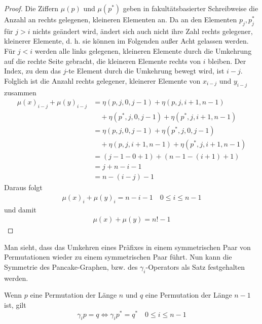 \documentclass[a4paper, 10pt, ngerman]{article}
\begin{document}
\begin{proof}
    Die Ziffern $\mu(p)$ und $\mu(p^*)$ geben in fakultätsbasierter Schreibweise die Anzahl an rechts gelegenen, kleineren Elementen an. Da an den Elementen $p_j, p^*_j$ für $j > i$ nichts geändert wird, ändert sich auch nicht ihre Zahl rechts gelegener, kleinerer Elemente, d. h. sie können im Folgenden außer Acht gelassen werden. Für $j < i$ werden alle links gelegenen, kleineren Elemente durch die Umkehrung auf die rechte Seite gebracht, die kleineren Elemente rechts von $i$ bleiben. Der Index, zu dem das $j$-te Element durch die Umkehrung bewegt wird, ist $i - j$. Folglich ist die Anzahl rechts gelegener, kleinerer Elemente von $x_{i - j}$ und $y_{i - j}$ zusammen
    \begin{align*}
        \mu(x)_{i - j} + \mu(y)_{i - j}
         & =  \eta(p, j, 0, j - 1) + \eta(p, j, i + 1, n - 1)            \\
         & \quad + \eta(p^*, j, 0, j - 1) + \eta(p^*, j, i + 1, n - 1)   \\
         & =  \eta(p, j, 0, j - 1) + \eta(p^*, j, 0, j - 1)              \\
         & \quad + \eta(p, j, i + 1, n - 1) + \eta(p^*, j, i + 1, n - 1) \\
         & =  (j - 1 - 0 + 1) + (n - 1 - (i + 1) + 1)                    \\
         & =  j + n - i - 1                                              \\
         & =  n - (i - j) - 1
    \end{align*}
    Daraus folgt
    \begin{align*}
        \mu(x)_i + \mu(y)_i = n - i - 1 \quad 0 \le i \le n - 1
    \end{align*}
    und damit
    \begin{align*}
        \mu(x) + \mu(y) = n! - 1
    \end{align*}
\end{proof}

Man sieht, dass das Umkehren eines Präfixes in einem symmetrischen Paar von Permutationen wieder zu einem symmetrischen Paar führt. Nun kann die Symmetrie des Pancake-Graphen, bzw. des $\gamma_i$-Operators als Satz festgehalten werden.

\begin{theorem}
    Wenn $p$ eine Permutation der Länge $n$ und $q$ eine Permutation der Länge $n - 1$ ist, gilt
    $$
        \gamma_i p = q \Longleftrightarrow \gamma_i p^* = q^* \quad 0 \le i \le n - 1
    $$
\end{theorem}
\end{document}
